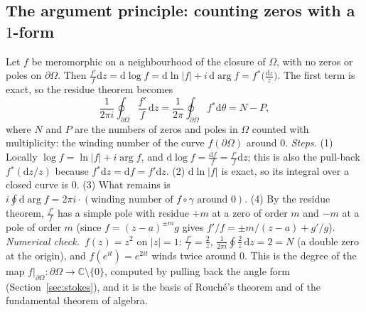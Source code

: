 \documentclass[11pt,a4paper]{article}
\numberwithin{equation}{section}
\theoremstyle{definition}
\theoremstyle{plain}
\newcommand{\numcheck}{\textit{Numerical check.}\ }
\newcommand{\C}{\mathbb{C}}
\newcommand{\dd}{\mathrm{d}}
\newcommand{\pb}{{}^{*}}                            %
\begin{document}
\subsection{The argument principle: counting zeros with a $1$-form}\label{sec:argument}

Let $f$ be meromorphic on a neighbourhood of the closure of $\Omega$, with no zeros or poles on $\partial\Omega$. Then $\frac{f'}f\dd z=\dd\log f=\dd\ln|f|+i\,\dd\arg f=f\pb\bigl(\frac{\dd z}z\bigr)$. The first term is exact, so the residue theorem becomes
\begin{equation}\label{eq:argument}
\frac1{2\pi i}\oint_{\partial\Omega}\frac{f'}f\,\dd z=\frac1{2\pi}\oint_{\partial\Omega}f\pb\dd\theta=N-P,
\end{equation}
where $N$ and $P$ are the numbers of zeros and poles in $\Omega$ counted with multiplicity: the winding number of the curve $f(\partial\Omega)$ around $0$.
\emph{Steps.} (1) Locally $\log f=\ln|f|+i\arg f$, and $\dd\log f=\frac{\dd f}f=\frac{f'}f\dd z$; this is also the pull-back $f\pb(\dd z/z)$ because $f\pb\dd z=\dd f=f'\dd z$. (2) $\dd\ln|f|$ is exact, so its integral over a closed curve is $0$. (3) What remains is $i\oint\dd\arg f=2\pi i\cdot(\text{winding number of }f\circ\gamma\text{ around }0)$.
(4) By the residue theorem, $\frac{f'}f$ has a simple pole with residue $+m$ at a zero of order $m$ and $-m$ at a pole of order $m$ (since $f=(z-a)^{\pm m}g$ gives $f'/f=\pm m/(z-a)+g'/g$).
\numcheck $f(z)=z^2$ on $|z|=1$: $\frac{f'}f=\frac2z$, $\frac1{2\pi i}\oint\frac2z\,\dd z=2=N$ (a double zero at the origin), and $f(e^{it})=e^{2it}$ winds twice around $0$.
This is the degree of the map $f|_{\partial\Omega}:\partial\Omega\to\C\setminus\{0\}$, computed by pulling back the angle form (Section~\ref{sec:stokes}), and it is the basis of Rouch\'e's theorem and of the fundamental theorem of algebra.
\end{document}
